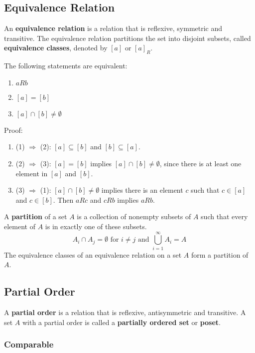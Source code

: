 \documentclass[a4paper,12pt]{article}
\begin{document}
\subsection{Equivalence Relation}

An \textbf{equivalence relation} is a relation that is reflexive, symmetric and transitive.
The equivalence relation partitions the set into disjoint subsets, called \textbf{equivalence classes}, denoted by $[a]$ or $[a]_R$.

The following statements are equivalent:
\begin{enumerate}
	\item $aRb$
	\item $[a] = [b]$
	\item $[a] \cap [b] \neq \emptyset$
\end{enumerate}

Proof:
\begin{enumerate}
	\item (1) $\Rightarrow$ (2): $[a] \subseteq [b]$ and $[b] \subseteq [a]$.
	\item (2) $\Rightarrow$ (3): $[a] = [b]$ implies $[a] \cap [b] \neq \emptyset$, since there is at least one element in $[a]$ and $[b]$.
	\item (3) $\Rightarrow$ (1): $[a] \cap [b] \neq \emptyset$ implies there is an element $c$ such that $c \in [a]$ and $c \in [b]$.
	Then $aRc$ and $cRb$ implies $aRb$.
\end{enumerate}

A \textbf{partition} of a set $A$ is a collection of nonempty subsets of $A$ such that every element of $A$ is in exactly one of these subsets.
\begin{equation*}
	A_i \cap A_j = \emptyset \text{ for } i \neq j \text{ and } \bigcup_{i=1}^{\infty} A_i = A
\end{equation*}
The equivalence classes of an equivalence relation on a set $A$ form a partition of $A$.

\subsection{Partial Order}

A \textbf{partial order} is a relation that is reflexive, antisymmetric and transitive.
A set $A$ with a partial order is called a \textbf{partially ordered set} or \textbf{poset}.

\subsubsection{Comparable}
\end{document}
